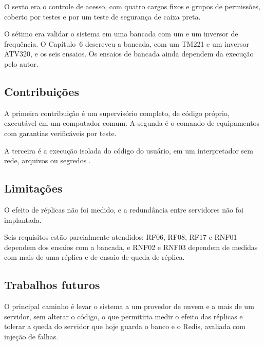 \par O sexto era o controle de acesso, com quatro cargos fixos e grupos de permissões, coberto por testes e por um teste de segurança de caixa preta.

\par O sétimo era validar o sistema em uma bancada com um  e um inversor de frequência. O Capítulo~6 descreveu a bancada, com um  TM221 e um inversor ATV320, e os seis ensaios. Os ensaios de bancada ainda dependem da execução pelo autor.

\subsection{Contribuições}

\par A primeira contribuição é um supervisório completo, de código próprio, executável em um computador comum. A segunda é o comando de equipamentos com garantias verificáveis por teste.

\par A terceira é a execução isolada do código do usuário, em um interpretador sem rede, arquivos ou segredos \cite{HAAS2017_WEBASSEMBLY}.

\subsection{Limitações}

\par O efeito de réplicas não foi medido, e a redundância entre servidores não foi implantada.

\par Seis requisitos estão parcialmente atendidos: RF06, RF08, RF17 e RNF01 dependem dos ensaios com a bancada, e RNF02 e RNF03 dependem de medidas com mais de uma réplica e de ensaio de queda de réplica.


\subsection{Trabalhos futuros}

\par O principal caminho é levar o sistema a um provedor de nuvem e a mais de um servidor, sem alterar o código, o que permitiria medir o efeito das réplicas e tolerar a queda do servidor que hoje guarda o banco e o Redis, avaliada com injeção de falhas.


